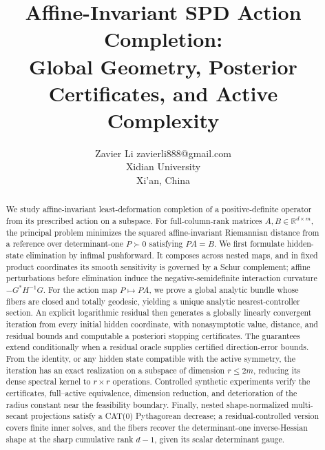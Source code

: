 \documentclass[10pt]{article}
\title{Affine-Invariant SPD Action Completion:\\
Global Geometry, Posterior Certificates, and Active Complexity}
\author{\name Zavier Li \email zavierli888@gmail.com\\
      \addr Xidian University\\
      \addr Xi'an, China}
\begin{document}
\maketitle

\begin{abstract}
We study affine-invariant least-deformation completion of a positive-definite
operator from its prescribed action on a subspace.  For full-column-rank
matrices \(A,B\in\mathbb R^{d\times m}\), the principal problem minimizes
the squared affine-invariant Riemannian distance from a reference over
determinant-one \(P\succ0\) satisfying \(PA=B\).  We first formulate hidden-state
elimination by infimal pushforward.  It composes across nested maps, and in
fixed product coordinates its smooth sensitivity is governed by a Schur
complement; affine perturbations before elimination induce the
negative-semidefinite interaction curvature \(-G^*H^{-1}G\).  For the action
map \(P\mapsto PA\), we prove a global analytic bundle whose fibers are closed
and totally geodesic, yielding a unique analytic nearest-controller section.
An explicit logarithmic residual then generates a globally linearly convergent
iteration from every initial hidden coordinate, with nonasymptotic value,
distance, and residual bounds and computable a posteriori stopping
certificates.  The guarantees extend conditionally when a residual oracle
supplies certified direction-error bounds.  From the identity, or any hidden
state compatible with the active symmetry, the iteration has an exact
realization on a subspace of dimension \(r\le 2m\), reducing its dense spectral
kernel to \(r\times r\) operations.  Controlled synthetic experiments verify
the certificates, full--active equivalence, dimension reduction, and
deterioration of the radius constant near the feasibility boundary.  Finally,
nested shape-normalized multi-secant projections satisfy a CAT(0) Pythagorean
decrease; a residual-controlled version covers finite inner solves, and the
fibers recover the determinant-one inverse-Hessian shape at the sharp
cumulative rank \(d-1\), given its scalar determinant gauge.
\end{abstract}















\appendix




\end{document}
